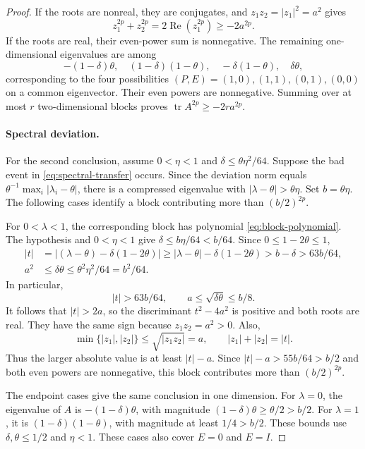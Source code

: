 \documentclass[11pt]{article}
\theoremstyle{definition}
\theoremstyle{remark}
\theoremstyle{plain}
\DeclareMathOperator{\tr}{tr}
\begin{document}
\begin{proof}
If the roots are nonreal, they
are conjugates, and \(z_1z_2=|z_1|^2=a^2\) gives
\[
 z_1^{2p}+z_2^{2p}
       =2\operatorname{Re}(z_1^{2p})\ge-2a^{2p}.
\]
If the roots are real, their even-power sum is nonnegative.
The remaining one-dimensional eigenvalues are among
\[
 -(1-\delta)\theta,\quad (1-\delta)(1-\theta),\quad
                  -\delta(1-\theta),\quad \delta\theta,
\]
corresponding to the four possibilities
\((P,E)=(1,0),(1,1),(0,1),(0,0)\) on a common eigenvector.
Their even powers are nonnegative. Summing over at most \(r\)
two-dimensional blocks proves \(\tr A^{2p}\ge-2ra^{2p}\).

\paragraph{Spectral deviation.}
For the second conclusion, assume \(0<\eta<1\) and
\(\delta\le\theta\eta^2/64\). Suppose the bad event in
\eqref{eq:spectral-transfer} occurs.
Since the deviation norm equals
$\theta^{-1}\max_i|\lambda_i-\theta|$, there is a compressed eigenvalue with
\(|\lambda-\theta|>\theta\eta\). Set \(b=\theta\eta\).
The following cases identify a block contributing more than \((b/2)^{2p}\).

For \(0<\lambda<1\), the corresponding block has polynomial
\eqref{eq:block-polynomial}. The hypothesis and \(0<\eta<1\) give
\(\delta\le b\eta/64<b/64\). Since \(0\le1-2\theta\le1\),
\[
 \begin{split}
 |t|&=|(\lambda-\theta)-\delta(1-2\theta)|
       \ge|\lambda-\theta|-\delta(1-2\theta)
       >b-\delta>63b/64,\\
 a^2&\le\delta\theta\le\theta^2\eta^2/64=b^2/64.
 \end{split}
\]
In particular,
\[
 |t|>63b/64,\qquad a\le\sqrt{\delta\theta}\le b/8.
\]
It follows that \(|t|>2a\), so the discriminant \(t^2-4a^2\)
is positive and both roots are real. They have the same sign
because \(z_1z_2=a^2>0\). Also,
\[
 \min\{|z_1|,|z_2|\}\le\sqrt{|z_1z_2|}=a,\qquad
 |z_1|+|z_2|=|t|.
\]
Thus the larger absolute value is at least \(|t|-a\).
Since \(|t|-a>55b/64>b/2\) and both even powers are nonnegative, this
block contributes more than \((b/2)^{2p}\).

The endpoint cases give the same conclusion in one dimension.
For \(\lambda=0\), the eigenvalue of \(A\) is
\(-(1-\delta)\theta\), with magnitude
\((1-\delta)\theta\ge\theta/2>b/2\).
For \(\lambda=1\), it is \((1-\delta)(1-\theta)\), with magnitude
at least \(1/4>b/2\). These bounds use
\(\delta,\theta\le1/2\) and \(\eta<1\).
These cases also cover \(E=0\) and \(E=I\).


\end{proof}
\end{document}
